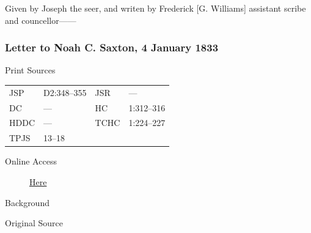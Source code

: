 				Given by Joseph the seer, and writen by Frederick [G. Williams] assistant scribe and councellor------
				
		\subsubsection{Letter to Noah C. Saxton, 4 January 1833}
			\label{EMS-1833-JS-4-JAN-1833}
		
			\begin{description}
				\item[Print Sources]
			\end{description}

				\begin{tabular}{p{0.5in}p{1in}p{0.5in}p{1in}}
				JSP	 	& D2:348--355		& JSR 		& --- \\
				DC	 	& --- 				& HC 		& 1:312--316 \\
				HDDC 	& ---				& TCHC 		& 1:224--227 \\
				TPJS 	& 13--18			& 	 		&  \\
				\end{tabular}
			
			\begin{description}
				\item[Online Access] \href{https://www.josephsmithpapers.org/paper-summary/letter-to-noah-c-saxton-4-january-1833/1}{Here}
			\end{description}
			
			\begin{description}
				\item[Background]
			\end{description}
			
			
			\begin{description}
				\item[Original Source]
			\end{description}
			
			
